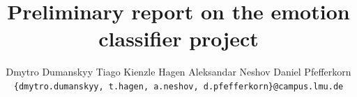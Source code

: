 \documentclass[10pt, letterpaper, twocolumn]{article}
\title{Preliminary report on the emotion classifier project}
\author{Dmytro Dumanskyy
\quad
Tiago Kienzle Hagen
\quad
Aleksandar Neshov
\quad
Daniel Pfefferkorn\\
\tt\small\{dmytro.dumanskyy, t.hagen, a.neshov, d.pfefferkorn\}@campus.lmu.de}
\begin{document}
\maketitle







{
    \small
    
    
}
\end{document}
